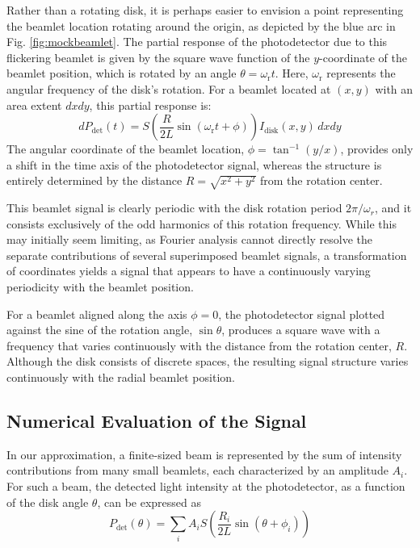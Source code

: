 \documentclass[12pt]{report}
\begin{document}
	Rather than a rotating disk, it is perhaps easier to envision a point representing the beamlet location rotating around the origin, as depicted by the blue arc in Fig. \ref{fig:mockbeamlet}. The partial response of the photodetector due to this flickering beamlet is given by the square wave function of the $y$-coordinate of the beamlet position, which is rotated by an angle $\theta = \omega_\mathrm{r} t$. Here, $\omega_\mathrm{r}$ represents the angular frequency of the disk's rotation. For a beamlet located at $(x,y)$ with an area extent $dxdy$, this partial response is:
	\begin{equation} \label{mock_beamlet}
		dP_\mathrm{det}(t) = S\left(\frac{R}{2L}\sin\left(\omega_\mathrm{r} t + \phi\right)\right) I_\mathrm{disk}(x,y)\,dx dy
	\end{equation}
	The angular coordinate of the beamlet location, $\phi = \tan^{-1} (y/x)$, provides only a shift in the time axis of the photodetector signal, whereas the structure is entirely determined by the distance $R = \sqrt{x^2 + y^2}$ from the rotation center.
	
	This beamlet signal is clearly periodic with the disk rotation period $2\pi/\omega_r$, and it consists exclusively of the odd harmonics of this rotation frequency. While this may initially seem limiting, as Fourier analysis cannot directly resolve the separate contributions of several superimposed beamlet signals, a transformation of coordinates yields a signal that appears to have a continuously varying periodicity with the beamlet position.
	
	For a beamlet aligned along the axis $\phi=0$, the photodetector signal plotted against the sine of the rotation angle, $\sin\theta$, produces a square wave with a frequency that varies continuously with the distance from the rotation center, $R$. Although the disk consists of discrete spaces, the resulting signal structure varies continuously with the radial beamlet position.
	
	
	\subsection{Numerical Evaluation of the Signal}
	
	In our approximation, a finite-sized beam is represented by the sum of intensity contributions from many small beamlets, each characterized by an amplitude $A_i$. For such a beam, the detected light intensity at the photodetector, as a function of the disk angle $\theta$, can be expressed as
	\begin{equation} \label{mock_beamSum}
		P_\mathrm{det}(\theta) = \sum_i A_i S\left(\frac{R_i}{2L}\sin\left(\theta + \phi_i\right)\right)
	\end{equation}
	
\end{document}
